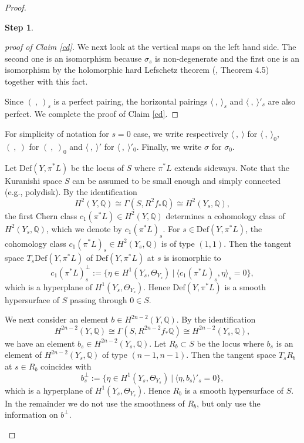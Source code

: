 \documentclass[12pt,a4paper]{amsart}
\theoremstyle{remark}
\theoremstyle{definition}
\newtheorem{Step}{Step}
\begin{document}
\begin{proof}
\begin{Step}
\begin{proof}[proof of Claim \ref{cd}]
We next look at the vertical maps on the left hand side. The second one is an isomorphism because $\sigma_s$ is non-degenerate and the first one is an isomorphism by the holomorphic hard Lefschetz theorem (\cite{Fujiki 2}, Theorem 4.5) together with this fact. 

Since $(\:, \:)_s$ is a perfect pairing, 
the horizontal pairings 
$\langle \:, \:\rangle_s$ and $\langle \:, \:\rangle'_s$ are also perfect. 
We complete the proof of Claim \ref{cd}. 
\end{proof}


\noindent
For simplicity of notation for $s=0$ case, we write respectively $\langle \:, \: \rangle$ for $\langle \:, \: \rangle_0$, $(\:, \:)$ for 
$(\:, \:)_0$ and $\langle \:, \: \rangle'$ for $\langle \:, \: \rangle'_0$. Finally, we write $\sigma$ for 
$\sigma_0$. 



\vspace{2mm}

Let $\mathrm{Def}(Y, \pi^*L)$ be the locus of $S$ where $\pi^*L$ extends sideways. 
Note that the Kuranishi space $S$ 
can be assumed to be small enough and simply connected (e.g., polydisk). 
By the identification
$$H^2(Y, \mathbb{Q}) \cong 
\Gamma (S, R^2f_*{\mathbb Q}) 
\cong H^2(Y_s, \mathbb{Q}),$$
the first Chern class $c_1(\pi^*L) \in H^2(Y, \mathbb{Q})$ determines a cohomology class of $H^2(Y_s, \mathbb{Q})$, which we denote by 
$c_1(\pi^*L)_s$. 
For $s \in \mathrm{Def}(Y, \pi^*L)$, the cohomology class $c_1(\pi^*L)_s \in H^2(Y_s, \mathbb{Q})$ is of type $(1,1)$. Then the tangent space 
$T_s\mathrm{Def}(Y, \pi^*L)$ of $\mathrm{Def}(Y, \pi^*L)$ at $s$ is isomorphic to 
$$c_1(\pi^*L)_s^{\perp} := 
\{\eta \in H^1(Y_s, \Theta_{Y_s})\: \vert \: 
\langle c_1(\pi^*L)_s, \eta \rangle_s = 0\},$$
which is a hyperplane of $H^1(Y_s, \Theta_{Y_s})$. Hence 
$\mathrm{Def}(Y, \pi^*L)$ is a 
smooth hypersurface of $S$ passing through $0 \in S$. 

We next consider an element $b \in H^{2n-2}(Y, \mathbb{Q})$.  By the  
identification $$H^{2n-2}(Y, \mathbb{Q}) \cong 
\Gamma (S, R^{2n-2}f_*{\mathbb Q}) 
\cong H^{2n-2}(Y_s, \mathbb{Q}),$$ we have an element $b_s \in H^{2n-2}(Y_s, \mathbb{Q})$.  
Let $R_b \subset S$ be the locus 
where $b_s$ is an element of $H^{2n-2}(Y_s, \mathbb{Q})$ of type $(n-1, n-1)$. 
Then the tangent space $T_sR_b$ 
at $s \in R_b$ coincides with 
$$b_s^{\perp} := \{\eta \in H^1(Y_s, \Theta_{Y_s})\: \vert \: \langle \eta, b_s \rangle'_s = 0\},$$ which is a
hyperplane of $H^1(Y_s, \Theta_{Y_s})$. Hence $R_b$ is a 
smooth hypersurface of $S$. 
In the remainder we do not use the smoothness of $R_b$, but only use the information on $b^{\perp}$. 


\end{Step}
\end{proof}
\end{document}
